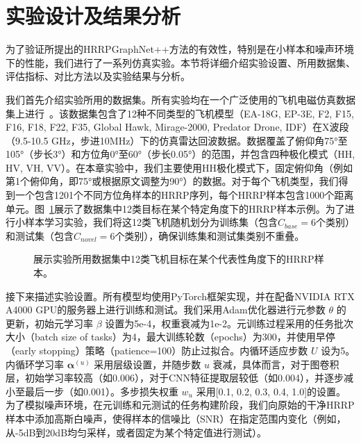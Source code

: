 \section{实验设计及结果分析}
\label{sec:experiments}

为了验证所提出的HRRPGraphNet++方法的有效性，特别是在小样本和噪声环境下的性能，我们进行了一系列仿真实验。本节将详细介绍实验设置、所用数据集、评估指标、对比方法以及实验结果与分析。

我们首先介绍实验所用的数据集。所有实验均在一个广泛使用的飞机电磁仿真数据集上进行~\cite{Chen2024, Liu2024, liu2024scnet, liu2021multi, liu2025attribute}。该数据集包含了12种不同类型的飞机模型（EA-18G, EP-3E, F2, F15, F16, F18, F22, F35, Global Hawk, Mirage-2000, Predator Drone, IDF）在X波段（9.5-10.5 GHz，步进10MHz）下的仿真雷达回波数据。数据覆盖了俯仰角75°至105°（步长3°）和方位角0°至60°（步长0.05°）的范围，并包含四种极化模式（HH, HV, VH, VV）。在本章实验中，我们主要使用HH极化模式下，固定俯仰角（例如第1个俯仰角，即75°或根据原文调整为90°）的数据。对于每个飞机类型，我们得到一个包含1201个不同方位角样本的HRRP序列，每个HRRP样本包含1000个距离单元。图~\ref{fig:dataset_chap3}展示了数据集中12类目标在某个特定角度下的HRRP样本示例。为了进行小样本学习实验，我们将这12类飞机随机划分为训练集（包含$C_{base}=6$个类别）和测试集（包含$C_{novel}=6$个类别），确保训练集和测试集类别不重叠。

\begin{figure}[h!]
    \centering
    \caption{展示实验所用数据集中12类飞机目标在某个代表性角度下的HRRP样本。}
    \label{fig:dataset_chap3}
\end{figure}

接下来描述实验设置。所有模型均使用PyTorch框架实现，并在配备NVIDIA RTX A4000 GPU的服务器上进行训练和测试。我们采用Adam优化器进行元参数 $\theta$ 的更新，初始元学习率 $\beta$ 设置为5e-4，权重衰减为1e-2。元训练过程采用的任务批次大小（batch size of tasks）为4，最大训练轮数（epochs）为300，并使用早停（early stopping）策略（patience=100）防止过拟合。内循环适应步数 $U$ 设为5。内循环学习率 $\boldsymbol{\alpha}^{(u)}$ 采用层级设置，并随步数 $u$ 衰减，具体而言，对于图卷积层，初始学习率较高（如0.006），对于CNN特征提取层较低（如0.004），并逐步减小至最后一步（如0.001）。多步损失权重 $w_u$ 采用[0.1, 0.2, 0.3, 0.4, 1.0]的设置。为了模拟噪声环境，在元训练和元测试的任务构建阶段，我们向原始的干净HRRP样本中添加高斯白噪声，使得样本的信噪比（SNR）在指定范围内变化（例如，从-5dB到20dB均匀采样，或者固定为某个特定值进行测试）。

